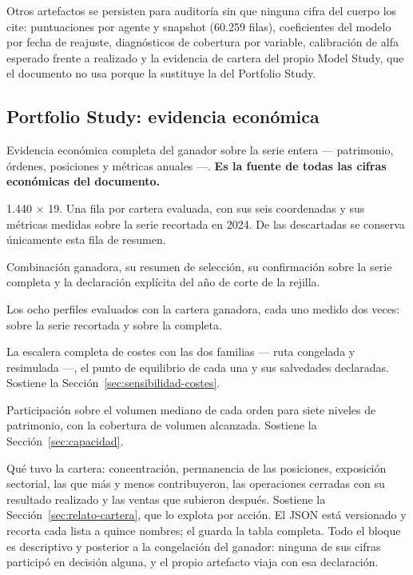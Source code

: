 Otros artefactos se persisten para auditoría sin que ninguna cifra del cuerpo los cite:
puntuaciones por agente y snapshot (60.259 filas), coeficientes del modelo por fecha de reajuste,
diagnósticos de cobertura por variable, calibración de alfa esperado frente a realizado y la
evidencia de cartera del propio Model Study, que el documento no usa porque la sustituye la del
Portfolio Study.

\subsection*{Portfolio Study: evidencia económica}

\begin{description}[leftmargin=0.5cm,style=nextline,font=\normalfont\ttfamily\small]
  \item[evidence\_best\_full/] Evidencia económica completa del ganador sobre la serie entera ---
  patrimonio, órdenes, posiciones y métricas anuales ---. \textbf{Es la fuente de todas las cifras
  económicas del documento.}
  \item[portfolio\_grid.parquet] 1.440 $\times$ 19. Una fila por cartera evaluada, con sus seis
  coordenadas y sus métricas medidas sobre la serie recortada en 2024. De las descartadas se
  conserva únicamente esta fila de resumen.
  \item[portfolio\_winner.json] Combinación ganadora, su resumen de selección, su confirmación sobre
  la serie completa y la declaración explícita del año de corte de la rejilla.
  \item[portfolio\_profiles.parquet] Los ocho perfiles evaluados con la cartera ganadora, cada uno
  medido dos veces: sobre la serie recortada y sobre la completa.
  \item[cost\_sensitivity.json] La escalera completa de costes con las dos familias --- ruta
  congelada y resimulada ---, el punto de equilibrio de cada una y sus salvedades declaradas.
  Sostiene la Sección~\ref{sec:sensibilidad-costes}.
  \item[capacity.json] Participación sobre el volumen mediano de cada orden para siete niveles de
  patrimonio, con la cobertura de volumen alcanzada. Sostiene la Sección~\ref{sec:capacidad}.
  \item[portfolio\_narrative.json, portfolio\_narrative\_holdings.parquet] Qué tuvo la cartera:
  concentración, permanencia de las posiciones, exposición sectorial, las que más y menos
  contribuyeron, las operaciones cerradas con su resultado realizado y las ventas que subieron
  después. Sostiene la Sección~\ref{sec:relato-cartera}, que lo explota por acción. El JSON está
  versionado y recorta cada lista a quince nombres; el  guarda la tabla completa.
  Todo el bloque es descriptivo y posterior a la congelación del ganador: ninguna de sus cifras
  participó en decisión alguna, y el propio artefacto viaja con esa declaración.
\end{description}

